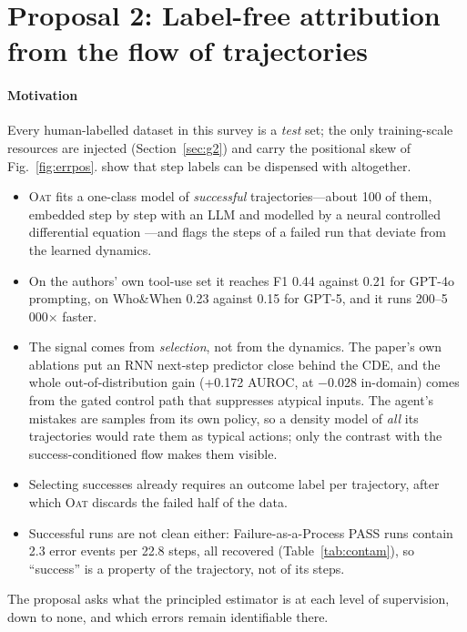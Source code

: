 \section{Proposal 2: Label-free attribution from the flow of trajectories}\label{sec:future:unsup}

\paragraph{Motivation} Every human-labelled dataset in this survey is a \emph{test} set; the only training-scale resources are injected (Section~\ref{sec:g2}) and carry the positional skew of Fig.~\ref{fig:errpos}. \citet{yeh2026oat} show that step labels can be dispensed with altogether.
\begin{itemize}[leftmargin=1.1em]
\item \textsc{Oat} fits a one-class model of \emph{successful} trajectories---about 100 of them, embedded step by step with an LLM and modelled by a neural controlled differential equation \cite{kidger2020ncde}---and flags the steps of a failed run that deviate from the learned dynamics.
\item On the authors' own tool-use set it reaches F1 0.44 against 0.21 for GPT-4o prompting, on Who\&When 0.23 against 0.15 for GPT-5, and it runs 200--5\,000$\times$ faster.
\item The signal comes from \emph{selection}, not from the dynamics. The paper's own ablations put an RNN next-step predictor close behind the CDE, and the whole out-of-distribution gain (+0.172 AUROC, at $-$0.028 in-domain) comes from the gated control path that suppresses atypical inputs. The agent's mistakes are samples from its own policy, so a density model of \emph{all} its trajectories would rate them as typical actions; only the contrast with the success-conditioned flow makes them visible.
\item Selecting successes already requires an outcome label per trajectory, after which \textsc{Oat} discards the failed half of the data.
\item Successful runs are not clean either: Failure-as-a-Process PASS runs contain 2.3 error events per 22.8 steps, all recovered (Table~\ref{tab:contam}), so ``success'' is a property of the trajectory, not of its steps.
\end{itemize}
The proposal asks what the principled estimator is at each level of supervision, down to none, and which errors remain identifiable there.

